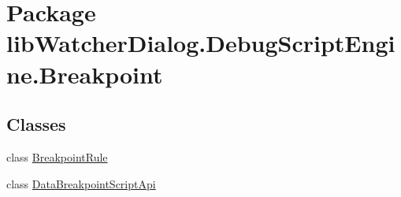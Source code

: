 \hypertarget{namespacelib_watcher_dialog_1_1_debug_script_engine_1_1_breakpoint}{\section{Package lib\+Watcher\+Dialog.\+Debug\+Script\+Engine.\+Breakpoint}
\label{namespacelib_watcher_dialog_1_1_debug_script_engine_1_1_breakpoint}
}
\subsection*{Classes}
\begin{DoxyCompactItemize}
\item 
class \hyperlink{classlib_watcher_dialog_1_1_debug_script_engine_1_1_breakpoint_1_1_breakpoint_rule}{Breakpoint\+Rule}
\item 
class \hyperlink{classlib_watcher_dialog_1_1_debug_script_engine_1_1_breakpoint_1_1_data_breakpoint_script_api}{Data\+Breakpoint\+Script\+Api}
\end{DoxyCompactItemize}

